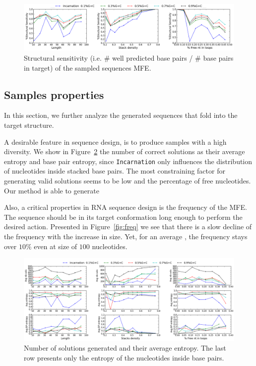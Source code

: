 \begin{figure}[ht!]
 	\centering
	\includegraphics[scale=0.45]{Figures/rnastrand_clustered_rnainverse_100samples_struct_sens.png}
	\caption{Structural sensitivity (i.e. $\#$ well predicted base pairs / $\#$ base pairs in target) of the sampled sequences MFE. }
	\label{fig:ss_sens}	
\end{figure}


\subsection{Samples properties}

In this section, we further analyze the generated sequences that fold into the 
target structure. 

A desirable feature in sequence design, is to produce samples with a high
diversity. We show in Figure~\ref{fig:nb_sols_entropy} the number of correct
solutions as their average entropy and base pair entropy, since 
\texttt{Incarnation}  only influences the distribution of nucleotides inside 
stacked base pairs. The most constraining factor for generating valid
 solutions seems to be  low \GCContent and the percentage of free nucleotides. Our method is able to generate 

Also, a critical properties in RNA sequence design is 
the frequency of the MFE. 
The sequence should be in its target conformation long enough to
perform the desired action. Presented in Figure~\ref{fig:freq} we see that
there is a slow decline of the frequency with the increase in size. Yet,
for an average \GCContent, the frequency stays over $10\%$ even
at size of $100$ nucleotides.


\begin{figure}[ht!]
	\centering
	\includegraphics[width=\textwidth]{Figures/nb_sols_entropy.png}
	\caption{Number of solutions generated and their average entropy. 
	The last row presents only the entropy of the nucleotides inside base 
	pairs.}
	\label{fig:nb_sols_entropy}
\end{figure}



